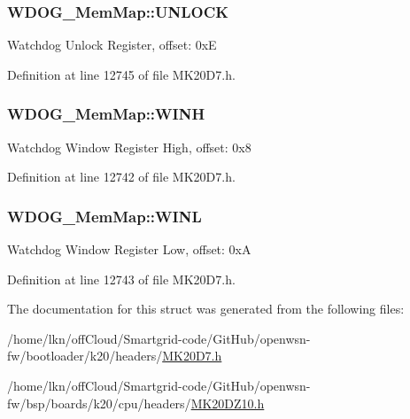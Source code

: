 \subsubsection[{\texorpdfstring{U\+N\+L\+O\+CK}{UNLOCK}}]{ W\+D\+O\+G\+\_\+\+Mem\+Map\+::\+U\+N\+L\+O\+CK}\hypertarget{struct_w_d_o_g___mem_map_a78988c0aeb0693a231757a4cc164e1bf}{}\label{struct_w_d_o_g___mem_map_a78988c0aeb0693a231757a4cc164e1bf}
Watchdog Unlock Register, offset\+: 0xE 

Definition at line 12745 of file M\+K20\+D7.\+h.

\subsubsection[{\texorpdfstring{W\+I\+NH}{WINH}}]{ W\+D\+O\+G\+\_\+\+Mem\+Map\+::\+W\+I\+NH}\hypertarget{struct_w_d_o_g___mem_map_a86589dc11cb4b7d3a00be9234372591f}{}\label{struct_w_d_o_g___mem_map_a86589dc11cb4b7d3a00be9234372591f}
Watchdog Window Register High, offset\+: 0x8 

Definition at line 12742 of file M\+K20\+D7.\+h.

\subsubsection[{\texorpdfstring{W\+I\+NL}{WINL}}]{ W\+D\+O\+G\+\_\+\+Mem\+Map\+::\+W\+I\+NL}\hypertarget{struct_w_d_o_g___mem_map_af238938251c1f5904a215c8a4ed1b74d}{}\label{struct_w_d_o_g___mem_map_af238938251c1f5904a215c8a4ed1b74d}
Watchdog Window Register Low, offset\+: 0xA 

Definition at line 12743 of file M\+K20\+D7.\+h.



The documentation for this struct was generated from the following files\+:\begin{DoxyCompactItemize}
\item 
/home/lkn/off\+Cloud/\+Smartgrid-\/code/\+Git\+Hub/openwsn-\/fw/bootloader/k20/headers/\hyperlink{bootloader_2k20_2headers_2_m_k20_d7_8h}{M\+K20\+D7.\+h}\item 
/home/lkn/off\+Cloud/\+Smartgrid-\/code/\+Git\+Hub/openwsn-\/fw/bsp/boards/k20/cpu/headers/\hyperlink{_m_k20_d_z10_8h}{M\+K20\+D\+Z10.\+h}\end{DoxyCompactItemize}
